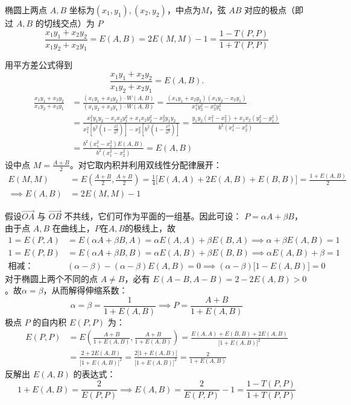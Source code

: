 \begin{conclusion}[一个内积关系式]
椭圆上两点 $A, B$ 坐标为$(x_1,y_1),(x_2,y_2)$，中点为$M$，弦 $AB$ 对应的极点（即过 $A,B$ 的切线交点）为 $P$
$$ \frac{x_1y_1+x_2y_2}{x_1y_2+x_2y_1} = E(A,B) = 2E(M,M) - 1 = \frac{1 - T(P,P)}{1 + T(P,P)}  $$
\end{conclusion}
用平方差公式得到
\[
\frac{x_1y_1+x_2y_2}{x_1y_2+x_2y_1}=E(A,B).
\]
\begin{align*}
\frac{x_1y_1+x_2y_2}{x_1y_2+x_2y_1} & = \frac{(x_1y_1+x_2y_2) \cdot W(A,B)}{(x_1y_2+x_2y_1) \cdot W(A,B)} = \frac{(x_1y_1+x_2y_2)(x_1y_2-x_2y_1)}{x_1^2 y_2^2 - x_2^2 y_1^2} \\
&=\frac{x_1^2 y_1 y_2 - x_1 x_2 y_1^2 + x_1 x_2 y_2^2 - x_2^2 y_1 y_2}{ x_1^2 \left[ b^2 \left(1 - \frac{x_2^2}{a^2}\right) \right] - x_2^2 \left[ b^2 \left(1 - \frac{x_1^2}{a^2}\right) \right] }=\frac{y_1y_2(x_1^2 - x_2^2) + x_1x_2(y_2^2 - y_1^2)}{b^2 (x_1^2 - x_2^2) }\\
&=\frac{ b^2 (x_1^2 - x_2^2) E(A,B) }{ b^2 (x_1^2 - x_2^2) } = E(A,B)
\end{align*}
设中点 $M = \frac{A+B}{2}$。对它取内积并利用双线性分配律展开：
\begin{align*} E(M,M) &= E\left(\frac{A+B}{2}, \frac{A+B}{2}\right) = \frac{1}{4} \big[ E(A,A) + 2E(A,B) + E(B,B) \big] =\frac{1 + E(A,B)}{2} \\
    \implies E(A,B) &= 2E(M,M) - 1\end{align*}

假设$\overrightarrow{OA}$ 与 $\overrightarrow{OB}$ 不共线，它们可作为平面的一组基。因此可设：
$ P = \alpha A + \beta B $，由于点 $A, B$ 在曲线上，$P$在$A,B$的极线上，故
\begin{align*}
1=E(P, A) &= E(\alpha A + \beta B, A) = \alpha E(A,A) + \beta E(B,A) \implies \alpha + \beta E(A,B) = 1 \\
1=E(P, B) &= E(\alpha A + \beta B, B) = \alpha E(A,B) + \beta E(B,B) \implies \alpha E(A,B) + \beta = 1\\
\text{相减：}&(\alpha - \beta) - (\alpha - \beta) E(A,B) = 0 \implies (\alpha - \beta)\big[1 - E(A,B)\big] = 0
\end{align*}
对于椭圆上两个不同的点 $A \neq B$，必有 $E(A-B, A-B)= 2 - 2E(A,B) > 0$。故$ \alpha = \beta $，从而解得伸缩系数：
$$ \alpha = \beta = \frac{1}{1 + E(A,B)} \implies P = \frac{A + B}{1 + E(A,B)} $$
极点 $P$ 的自内积 $E(P,P)$ 为：
\begin{align*}
E(P,P) &= E\left( \frac{A+B}{1+E(A,B)}, \frac{A+B}{1+E(A,B)} \right) = \frac{E(A,A) + E(B,B) + 2E(A,B)}{\big[1+E(A,B)\big]^2} \\
&= \frac{2 + 2E(A,B)}{\big[1+E(A,B)\big]^2} = \frac{2\big[1 + E(A,B)\big]}{\big[1+E(A,B)\big]^2} = \frac{2}{1 + E(A,B)}
\end{align*}
反解出 $E(A,B)$ 的表达式：
$$ 1 + E(A,B) = \frac{2}{E(P,P)} \implies E(A,B) = \frac{2}{E(P,P)} - 1= \frac{1 - T(P,P)}{1 + T(P,P)} $$

